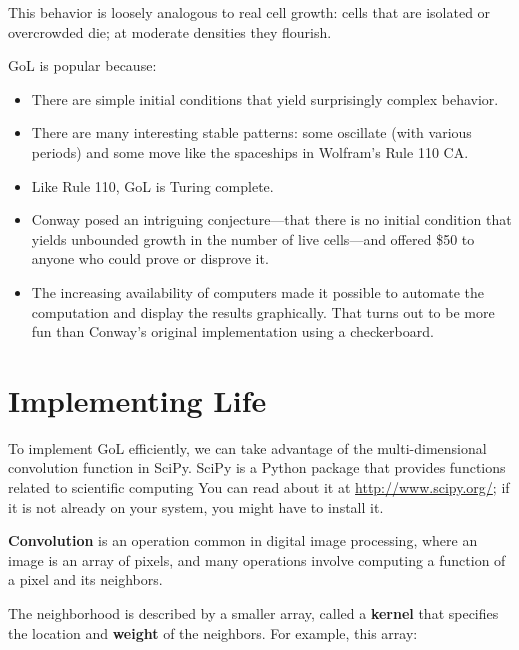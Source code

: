 \documentclass[10pt]{book}
\begin{document}
This behavior is loosely analogous to real cell growth: cells
that are isolated or overcrowded die; at moderate densities they
flourish.

GoL is popular because:

\begin{itemize}

\item There are simple initial conditions that yield
surprisingly complex behavior.

\item There are many interesting stable patterns: some
oscillate (with various periods) and some move like the
spaceships in Wolfram's Rule 110 CA.

\item Like Rule 110, GoL is Turing complete.

\item Conway posed an intriguing conjecture---that there is
no initial condition that yields unbounded growth in the number
of live cells---and offered \$50 to anyone who could prove
or disprove it.

\item The increasing availability of computers made it possible
to automate the computation and display the results graphically.
That turns out to be more fun than Conway's original implementation
using a checkerboard.

\end{itemize}


\section{Implementing Life}

To implement GoL efficiently, we can take advantage of the
multi-dimensional convolution function in SciPy.  SciPy is a Python
package that provides functions related to scientific computing
You can read about it at \url{http://www.scipy.org/}; if it is not
already on your system, you might have to install it.

{\bf Convolution} is an operation common in digital image processing,
where an image is an array of pixels, and many operations involve
computing a function of a pixel and its neighbors.

The neighborhood is described by a smaller array, called a {\bf kernel}
that specifies the location and {\bf weight} of the neighbors.  For
example, this array:
\end{document}
